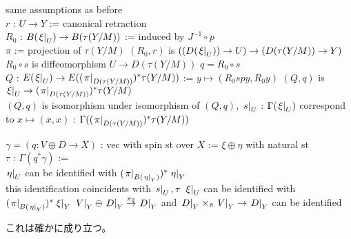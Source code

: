 \begin{Theorem}
\itemwhen
  \For same assumptions as before \\
  \Let \(r\) : \(U \to Y\) := canonical retraction \\
  \Let \(R_0\) : \(B(\left. {\xi} \right| _{U}) \to B(\tau(Y/M))\) := induced by \(J^{-1} \circ p\) \\
  \Let \(\pi\) := projection of \(\tau(Y/M)\)
\itemprop
  \Then \((R_0, r)\) is \(((D(\left. {\xi} \right| _{U})) \to U) \to (D(\tau(Y/M)) \to Y)\) \\
  \Then \(R_0 \circ s\) is diffeomorphism \(U \to D(\tau(Y/M))\)
\itemwhen
  \Let \(q = R_0 \circ s\) \\
  \Let \(Q\) : \(E(\left. {\xi} \right| _{U}) \to E((\left. {\pi} \right| _{D(\tau(Y/M))})^* \tau(Y/M))\) := \(y \mapsto (R_0 s p y, R_0 y)\)
\itemprop
  \Then \((Q, q)\) is \(\left. {\xi} \right| _{U} \to (\left. {\pi} \right| _{D(\tau(Y/M))})^* \tau(Y/M)\) \\
  \Then \((Q, q)\) is isomorphism
\itemprop
  \Then under isomorphism of \((Q, q)\), \(\left. {s} \right| _{U}\) : \(\Gamma(\left. {\xi} \right| _{U})\) correspond to \(x \mapsto (x, x)\) : \(\Gamma((\left. {\pi} \right| _{D(\tau(Y/M))})^* \tau(Y/M))\)
\end{Theorem}

\begin{Proof}
\itemprof
  
\end{Proof}

\begin{Theorem}
\itemprop
  \Let \(\gamma = (q : V \oplus D \to X)\) : vec with spin st over \(X\) := \(\xi \oplus \eta\) with natural st \\
  \Define \(\tau\) : \(\Gamma(q^* \gamma)\) :=  \\
  \Then \(\left. {\eta} \right| _{U}\) can be identified with \((\left. {\pi} \right| _{B(\left. {\eta} \right| _{Y})})^* \left. {\eta} \right| _{Y}\) \\
  \Then this identification coincidents with \(\left. {s} \right| _{U} , \tau\)
\itemprop
  \Then \(\left. {\xi} \right| _{U}\) can be identified with \((\left. {\pi} \right| _{B(\left. {\eta} \right| _{Y})})^* \left. {\xi} \right| _{Y}\) 
\itemprop
  \Then \(\left. {V} \right| _{Y} \oplus \left. {D} \right| _{Y} \overset{\pi_2}{\to} \left. {D} \right| _{Y}\) and \(\left. {D} \right| _{Y} \times_{\tilde{\pi}} \left. {V} \right| _{Y} \to \left. {D} \right| _{Y}\) can be identified
\end{Theorem}

\begin{Proof}
\itemprof
  \ADMIT
\itemprof
  \ADMIT
\itemprof
  これは確かに成り立つ。
\end{Proof}

